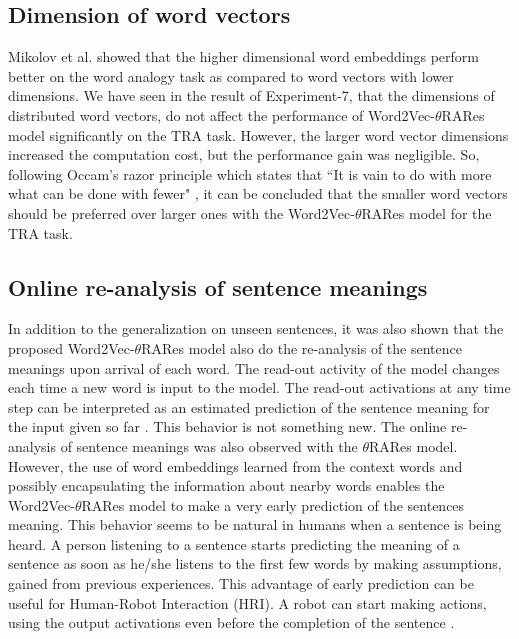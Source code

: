 \subsection{Dimension of word vectors}

Mikolov et al. \cite{w2v:mikolov_2013_efficient,w2v:mikolov_2013_distributed} showed that the higher dimensional word embeddings perform better on the word analogy task as compared to word vectors with lower dimensions. We have seen in the result of Experiment-7, that the dimensions of distributed word vectors,  do not affect the performance of Word2Vec-$\theta$RARes model significantly on the TRA task. However, the larger word vector dimensions increased the computation cost, but the performance gain was negligible. So, following Occam's razor principle which states that ``It is vain to do with more what can be done with fewer" \cite{razor:franklin_2002}, it can be concluded that the smaller word vectors should be preferred over larger ones with the Word2Vec-$\theta$RARes model for the TRA task.

\subsection{Online re-analysis of sentence meanings}

In addition to the generalization on unseen sentences, it was also shown that the proposed Word2Vec-$\theta$RARes model also do the re-analysis of the sentence meanings upon arrival of each word. The read-out activity of the model changes each time a new word is input to the model. The read-out activations at any time step can be interpreted as an estimated prediction of the sentence meaning for the input given so far \cite{xavier:2013:RT}. This behavior is not something new. The online re-analysis of sentence meanings was also observed with the $\theta$RARes model. However, the use of word embeddings learned from the context words and possibly encapsulating the information about nearby words enables the Word2Vec-$\theta$RARes model to make a very early prediction of the sentences meaning. This behavior seems to be natural in humans when a sentence is being heard. A person listening to a sentence starts predicting the meaning of a sentence as soon as he/she listens to the first few words by making assumptions, gained from previous experiences. This advantage of early prediction can be useful for Human-Robot Interaction (HRI). A robot can start making actions, using the output activations even before the completion of the sentence \cite{tra:xavier_hri}.


